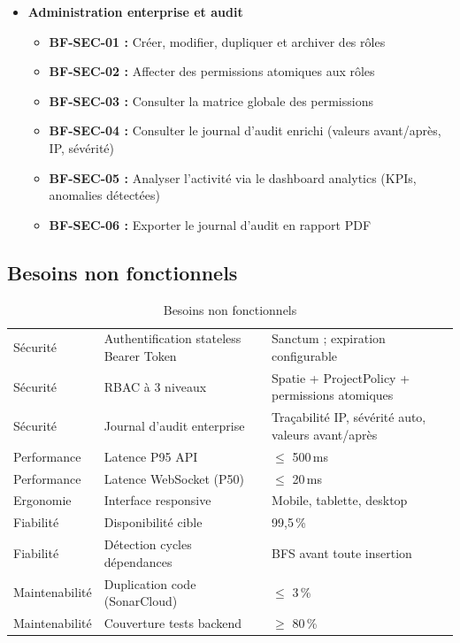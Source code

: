 \begin{itemize}
  \item \textbf{Administration enterprise et audit}
  \begin{itemize}
    \item \textbf{BF-SEC-01 :} Créer, modifier, dupliquer et archiver des rôles
    \item \textbf{BF-SEC-02 :} Affecter des permissions atomiques aux rôles
    \item \textbf{BF-SEC-03 :} Consulter la matrice globale des permissions
    \item \textbf{BF-SEC-04 :} Consulter le journal d'audit enrichi
          (valeurs avant/après, IP, sévérité)
    \item \textbf{BF-SEC-05 :} Analyser l'activité via le dashboard analytics
          (KPIs, anomalies détectées)
    \item \textbf{BF-SEC-06 :} Exporter le journal d'audit en rapport PDF
  \end{itemize}

\end{itemize}

\subsection{Besoins non fonctionnels}

\begin{table}[H]
  \centering
  \caption{Besoins non fonctionnels}
  \label{tab:bnf}
  \begin{tabularx}{\textwidth}{L{3cm}L{5cm}X}
    \toprule
     &  &  \\
    \midrule
    Sécurité     & Authentification stateless Bearer Token & Sanctum ; expiration configurable \\
    Sécurité     & RBAC à 3 niveaux                        & Spatie + ProjectPolicy + permissions atomiques \\
    Sécurité     & Journal d'audit enterprise              & Traçabilité IP, sévérité auto, valeurs avant/après \\
    Performance  & Latence P95 API                         & $\leq$ 500\,ms \\
    Performance  & Latence WebSocket (P50)                 & $\leq$ 20\,ms \\
    Ergonomie    & Interface responsive                    & Mobile, tablette, desktop \\
    Fiabilité    & Disponibilité cible                     & 99,5\,\% \\
    Fiabilité    & Détection cycles dépendances            & BFS avant toute insertion \\
    Maintenabilité & Duplication code (SonarCloud)         & $\leq$ 3\,\% \\
    Maintenabilité & Couverture tests backend              & $\geq$ 80\,\% \\
    \bottomrule
  \end{tabularx}
\end{table}

